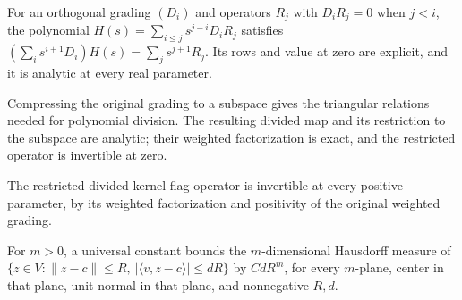 \begin{lemma}
\label{lem:graded-polynomial-division}

For an orthogonal grading $(D_i)$ and operators $R_j$ with $D_iR_j=0$ when $j<i$, the polynomial $H(s)=\sum_{i\le j}s^{j-i}D_iR_j$ satisfies $(\sum_i s^{i+1}D_i)H(s)=\sum_j s^{j+1}R_j$. Its rows and value at zero are explicit, and it is analytic at every real parameter.
\end{lemma}

\begin{lemma}
\label{lem:kernel-flag-divided-operators}

Compressing the original grading to a subspace gives the triangular relations needed for polynomial division. The resulting divided map and its restriction to the subspace are analytic; their weighted factorization is exact, and the restricted operator is invertible at zero.
\end{lemma}

\begin{lemma}
\label{lem:divided-operator-positive-inverse}

The restricted divided kernel-flag operator is invertible at every positive parameter, by its weighted factorization and positivity of the original weighted grading.
\end{lemma}

\begin{lemma}
\label{lem:plane-slab-measure}

For $m>0$, a universal constant bounds the $m$-dimensional Hausdorff measure of $\{z\in V:\|z-c\|\le R,\ |\langle v,z-c\rangle|\le dR\}$ by $CdR^m$, for every $m$-plane, center in that plane, unit normal in that plane, and nonnegative $R,d$.
\end{lemma}


